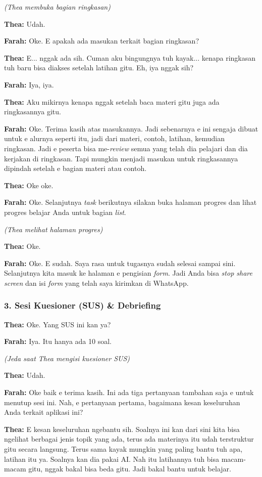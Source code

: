 \textit{(Thea membuka bagian ringkasan)}

\textbf{Thea:} Udah.

\textbf{Farah:} Oke. E apakah ada masukan terkait bagian ringkasan?

\textbf{Thea:} E... nggak ada sih. Cuman aku bingungnya tuh kayak... kenapa ringkasan tuh baru bisa diakses setelah latihan gitu. Eh, iya nggak sih?

\textbf{Farah:} Iya, iya.

\textbf{Thea:} Aku mikirnya kenapa nggak setelah baca materi gitu juga ada ringkasannya gitu.

\textbf{Farah:} Oke. Terima kasih atas masukannya. Jadi sebenarnya e ini sengaja dibuat untuk e alurnya seperti itu, jadi dari materi, contoh, latihan, kemudian ringkasan. Jadi e peserta bisa me-\textit{review} semua yang telah dia pelajari dan dia kerjakan di ringkasan. Tapi mungkin menjadi masukan untuk ringkasannya dipindah setelah e bagian materi atau contoh.

\textbf{Thea:} Oke oke.

\textbf{Farah:} Oke. Selanjutnya \textit{task} berikutnya silakan buka halaman progres dan lihat progres belajar Anda untuk bagian \textit{list}.

\textit{(Thea melihat halaman progres)}

\textbf{Thea:} Oke.

\textbf{Farah:} Oke. E sudah. Saya rasa untuk tugasnya sudah selesai sampai sini. Selanjutnya kita masuk ke halaman e pengisian \textit{form}. Jadi Anda bisa \textit{stop share screen} dan isi \textit{form} yang telah saya kirimkan di WhatsApp.

\bigskip

\subsubsection*{3. Sesi Kuesioner (SUS) \& Debriefing}

\textbf{Thea:} Oke. Yang SUS ini kan ya?

\textbf{Farah:} Iya. Itu hanya ada 10 soal.

\textit{(Jeda saat Thea mengisi kuesioner SUS)}

\textbf{Thea:} Udah.

\textbf{Farah:} Oke baik e terima kasih. Ini ada tiga pertanyaan tambahan saja e untuk menutup sesi ini. Nah, e pertanyaan pertama, bagaimana kesan keseluruhan Anda terkait aplikasi ini?

\textbf{Thea:} E kesan keseluruhan ngebantu sih. Soalnya ini kan dari sini kita bisa ngelihat berbagai jenis topik yang ada, terus ada materinya itu udah terstruktur gitu secara langsung. Terus sama kayak mungkin yang paling bantu tuh apa, latihan itu ya. Soalnya kan dia pakai AI. Nah itu latihannya tuh bisa macam-macam gitu, nggak bakal bisa beda gitu. Jadi bakal bantu untuk belajar.

